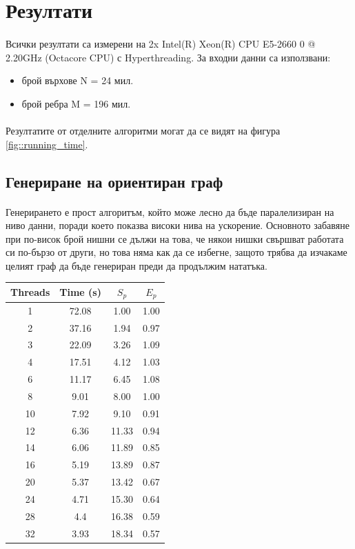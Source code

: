 \section{Резултати}

\paragraph*{} Всички резултати са измерени на 2x Intel(R) Xeon(R) CPU E5-2660 0 @ 2.20GHz (Octacore CPU) с Hyperthreading. За входни данни са използвани:
\begin{itemize}
\item брой върхове N = 24 мил.
\item брой ребра M = 196 мил.
\end{itemize}

\paragraph*{} Резултатите от отделните алгоритми могат да се видят на фигура \ref{fig::running_time}.

\subsection*{Генериране на ориентиран граф}

\paragraph*{} Генерирането е прост алгоритъм, който може лесно да бъде паралелизиран на ниво данни, поради което показва високи нива на ускорение. Основното забавяне при по-висок брой нишни се дължи на това, че някои нишки свършват работата си по-бързо от други, но това няма как да се избегне, защото трябва да изчакаме целият граф да бъде генериран преди да продължим нататъка. \\

\begin{tabular}{|c|c|c|c|}
\hline
Threads & Time (s) & $S_p$ & $E_p$\\
\hline \hline
1 & 72.08 & 1.00 & 1.00 \\
\hline
2 & 37.16 & 1.94 & 0.97 \\
\hline
3 & 22.09 & 3.26 & 1.09 \\
\hline
4 & 17.51 & 4.12 & 1.03 \\
\hline
6 & 11.17 & 6.45 & 1.08 \\
\hline
8 & 9.01 & 8.00 & 1.00 \\
\hline
10 & 7.92 & 9.10 & 0.91 \\
\hline
12 & 6.36 & 11.33 & 0.94 \\
\hline
14 & 6.06 & 11.89 & 0.85 \\
\hline
16 & 5.19 & 13.89 & 0.87 \\
\hline
20 & 5.37 & 13.42 & 0.67 \\
\hline
24 & 4.71 & 15.30 & 0.64 \\
\hline
28 & 4.4 & 16.38 & 0.59 \\
\hline
32 & 3.93 & 18.34 & 0.57 \\
\hline
\end{tabular}

